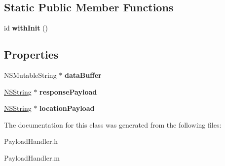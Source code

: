 \subsection*{\-Static \-Public \-Member \-Functions}
\begin{DoxyCompactItemize}
\item 
\hypertarget{interface_payload_handler_a56bbc7ba0b29185d7e9a31e5b6cc04ce}{
id {\bfseries with\-Init} ()}
\label{interface_payload_handler_a56bbc7ba0b29185d7e9a31e5b6cc04ce}

\end{DoxyCompactItemize}
\subsection*{\-Properties}
\begin{DoxyCompactItemize}
\item 
\hypertarget{interface_payload_handler_a3d4fd27fea084503a212b0a0da04b6d2}{
\-N\-S\-Mutable\-String $\ast$ {\bfseries data\-Buffer}}
\label{interface_payload_handler_a3d4fd27fea084503a212b0a0da04b6d2}

\item 
\hypertarget{interface_payload_handler_a9fceda7756e28f9bf6be362a12446960}{
\hyperlink{class_n_s_string}{\-N\-S\-String} $\ast$ {\bfseries response\-Payload}}
\label{interface_payload_handler_a9fceda7756e28f9bf6be362a12446960}

\item 
\hypertarget{interface_payload_handler_a95790d2ec2ddc1b57ad86baf343ab0da}{
\hyperlink{class_n_s_string}{\-N\-S\-String} $\ast$ {\bfseries location\-Payload}}
\label{interface_payload_handler_a95790d2ec2ddc1b57ad86baf343ab0da}

\end{DoxyCompactItemize}


\-The documentation for this class was generated from the following files\-:\begin{DoxyCompactItemize}
\item 
\-Payload\-Handler.\-h\item 
\-Payload\-Handler.\-m\end{DoxyCompactItemize}
